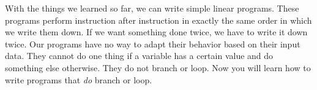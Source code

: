 %
%
With the things we learned so far, we can write simple linear programs.
These programs perform instruction after instruction in exactly the same order in which we write them down.
If we want something done twice, we have to write it down twice.
Our programs have no way to adapt their behavior based on their input data.
They cannot do one thing if a variable has a certain value and do something else otherwise.
They do not branch or loop.
Now you will learn how to write programs that \emph{do} branch or loop.%
%
%
%
\endhsection%
%
